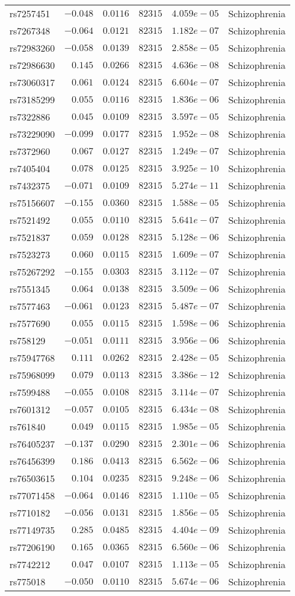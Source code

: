 \begin{tabular}{lrrrrl}
rs7257451&$-0.048$&$0.0116$&$ 82315$&$4.059e-05$&Schizophrenia\tabularnewline
rs7267348&$-0.064$&$0.0121$&$ 82315$&$1.182e-07$&Schizophrenia\tabularnewline
rs72983260&$-0.058$&$0.0139$&$ 82315$&$2.858e-05$&Schizophrenia\tabularnewline
rs72986630&$ 0.145$&$0.0266$&$ 82315$&$4.636e-08$&Schizophrenia\tabularnewline
rs73060317&$ 0.061$&$0.0124$&$ 82315$&$6.604e-07$&Schizophrenia\tabularnewline
rs73185299&$ 0.055$&$0.0116$&$ 82315$&$1.836e-06$&Schizophrenia\tabularnewline
rs7322886&$ 0.045$&$0.0109$&$ 82315$&$3.597e-05$&Schizophrenia\tabularnewline
rs73229090&$-0.099$&$0.0177$&$ 82315$&$1.952e-08$&Schizophrenia\tabularnewline
rs7372960&$ 0.067$&$0.0127$&$ 82315$&$1.249e-07$&Schizophrenia\tabularnewline
rs7405404&$ 0.078$&$0.0125$&$ 82315$&$3.925e-10$&Schizophrenia\tabularnewline
rs7432375&$-0.071$&$0.0109$&$ 82315$&$5.274e-11$&Schizophrenia\tabularnewline
rs75156607&$-0.155$&$0.0360$&$ 82315$&$1.588e-05$&Schizophrenia\tabularnewline
rs7521492&$ 0.055$&$0.0110$&$ 82315$&$5.641e-07$&Schizophrenia\tabularnewline
rs7521837&$ 0.059$&$0.0128$&$ 82315$&$5.128e-06$&Schizophrenia\tabularnewline
rs7523273&$ 0.060$&$0.0115$&$ 82315$&$1.609e-07$&Schizophrenia\tabularnewline
rs75267292&$-0.155$&$0.0303$&$ 82315$&$3.112e-07$&Schizophrenia\tabularnewline
rs7551345&$ 0.064$&$0.0138$&$ 82315$&$3.509e-06$&Schizophrenia\tabularnewline
rs7577463&$-0.061$&$0.0123$&$ 82315$&$5.487e-07$&Schizophrenia\tabularnewline
rs7577690&$ 0.055$&$0.0115$&$ 82315$&$1.598e-06$&Schizophrenia\tabularnewline
rs758129&$-0.051$&$0.0111$&$ 82315$&$3.956e-06$&Schizophrenia\tabularnewline
rs75947768&$ 0.111$&$0.0262$&$ 82315$&$2.428e-05$&Schizophrenia\tabularnewline
rs75968099&$ 0.079$&$0.0113$&$ 82315$&$3.386e-12$&Schizophrenia\tabularnewline
rs7599488&$-0.055$&$0.0108$&$ 82315$&$3.114e-07$&Schizophrenia\tabularnewline
rs7601312&$-0.057$&$0.0105$&$ 82315$&$6.434e-08$&Schizophrenia\tabularnewline
rs761840&$ 0.049$&$0.0115$&$ 82315$&$1.985e-05$&Schizophrenia\tabularnewline
rs76405237&$-0.137$&$0.0290$&$ 82315$&$2.301e-06$&Schizophrenia\tabularnewline
rs76456399&$ 0.186$&$0.0413$&$ 82315$&$6.562e-06$&Schizophrenia\tabularnewline
rs76503615&$ 0.104$&$0.0235$&$ 82315$&$9.248e-06$&Schizophrenia\tabularnewline
rs77071458&$-0.064$&$0.0146$&$ 82315$&$1.110e-05$&Schizophrenia\tabularnewline
rs7710182&$-0.056$&$0.0131$&$ 82315$&$1.856e-05$&Schizophrenia\tabularnewline
rs77149735&$ 0.285$&$0.0485$&$ 82315$&$4.404e-09$&Schizophrenia\tabularnewline
rs77206190&$ 0.165$&$0.0365$&$ 82315$&$6.560e-06$&Schizophrenia\tabularnewline
rs7742212&$ 0.047$&$0.0107$&$ 82315$&$1.113e-05$&Schizophrenia\tabularnewline
rs775018&$-0.050$&$0.0110$&$ 82315$&$5.674e-06$&Schizophrenia\tabularnewline

\end{tabular}
